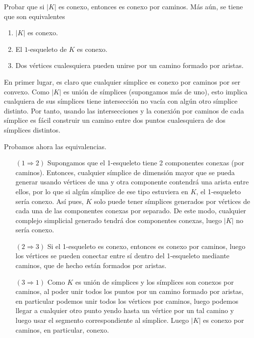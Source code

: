 \documentclass[twoside]{article}
\begin{document}
\begin{ejercicio}{1.5}
Probar que si $|K|$ es conexo, entonces es conexo por caminos.
Más aún, se tiene que son equivalentes
\begin{enumerate}
\item $|K|$ es conexo.
\item El $1$-esqueleto de $K$ es conexo.
\item Dos vértices cualesquiera pueden unirse por un camino formado por aristas.
\end{enumerate}
\end{ejercicio}
\begin{solucion}
En primer lugar, es claro que cualquier símplice es conexo por caminos por ser convexo. Como $|K|$ es unión de símplices (supongamos más de uno), esto implica cualquiera de sus símplices tiene intersección no vacía con algún otro símplice distinto. Por tanto, usando las intersecciones y la conexión por caminos de cada símplice es fácil construir un camino entre dos puntos cualesquiera de dos símplices distintos.

Probamos ahora las equivalencias.
\begin{enumerate}
\item[$(1\Rightarrow 2)$] Supongamos que el 1-esqueleto tiene 2 componentes conexas (por caminos). Entonces, cualquier símplice de dimensión mayor que se pueda generar usando vértices de una y otra componente contendrá una arista entre ellos, por lo que si algún símplice de ese tipo estuviera en $K$, el 1-esqueleto sería conexo. Así pues, $K$ solo puede tener símplices generados por vértices de cada una de las componentes conexas por separado. De este modo, cualquier complejo simplicial  generado tendrá dos componentes conexas, luego $|K|$ no sería conexo.
\item[$(2\Rightarrow 3)$] Si el 1-esqueleto es conexo, entonces es conexo por caminos, luego los vértices se pueden conectar entre sí dentro del 1-esqueleto mediante caminos, que de hecho están formados por aristas.
\item[$(3\Rightarrow 1)$] Como $K$ es unión de símplices y los símplices son conexos por caminos, al poder unir todos los puntos por un camino formado por aristas, en particular podemos unir todos los vértices por caminos, luego podemos llegar a cualquier otro punto yendo hasta un vértice por un tal camino y luego usar el segmento correspondiente al símplice. Luego $|K|$ es conexo por caminos, en particular, conexo.
\end{enumerate}

\end{solucion}
\end{document}

